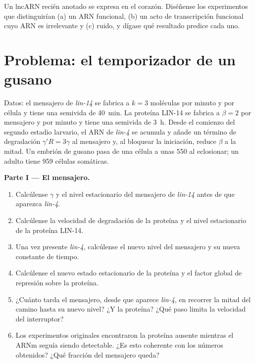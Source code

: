 \begin{exercise}[$\star\star\star$]\label{exo:b3:rna-regulation:12}
Un lncARN recién anotado se expresa en el corazón. Diséñense los
experimentos que distinguirían (a) un ARN funcional, (b) un acto de
transcripción funcional cuyo ARN es irrelevante y (c) ruido, y dígase qué
resultado predice cada uno.
\end{exercise}

\section{Problema: el temporizador de un gusano}

\begin{problem}
\label{pb:b3:rna-regulation:1}
Datos: el mensajero de \emph{lin-14} se fabrica a $k = 3$ moléculas por
minuto y por célula y tiene una semivida de \qty{40}{min}. La proteína
LIN-14 se fabrica a $\beta = 2$ por mensajero y por minuto y tiene una
semivida de \qty{3}{h}. Desde el comienzo del segundo estadio larvario,
el ARN de \emph{lin-4} se acumula y añade un término de degradación
$\gamma' R = 3\gamma$ al mensajero y, al bloquear la iniciación, reduce
$\beta$ a la mitad. Un embrión de gusano pasa de una célula a unas
\num{550} al eclosionar; un adulto tiene \num{959} células somáticas.

\medskip
\noindent\textbf{Parte I --- El mensajero.}
\begin{enumerate}
  \item Calcúlense $\gamma$ y el nivel estacionario del mensajero de
        \emph{lin-14} antes de que aparezca \emph{lin-4}.
  \item Calcúlense la velocidad de degradación de la proteína y el nivel
        estacionario de la proteína LIN-14.
  \item Una vez presente \emph{lin-4}, calcúlense el nuevo nivel del
        mensajero y su nueva constante de tiempo.
  \item Calcúlense el nuevo estado estacionario de la proteína y el
        factor global de represión sobre la proteína.
  \item ¿Cuánto tarda el mensajero, desde que aparece \emph{lin-4}, en
        recorrer la mitad del camino hasta su nuevo nivel? ¿Y la
        proteína? ¿Qué paso limita la velocidad del interruptor?
  \item Los experimentos originales encontraron la proteína ausente
        mientras el ARNm seguía siendo detectable. ¿Es esto coherente
        con los números obtenidos? ¿Qué fracción del mensajero queda?
\end{enumerate}


\end{problem}
